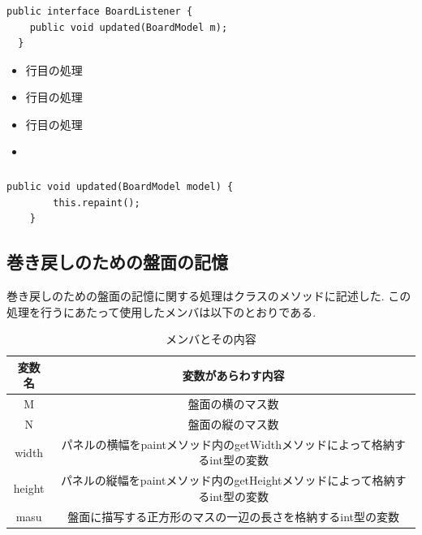 \documentclass[dvipdfmx]{jarticle}
\begin{document}
\subsubsection{}
\begin{lstlisting}[caption=コード,label=fuga]
  public interface BoardListener {
    public void updated(BoardModel m);
  }
\end{lstlisting}
\begin{itemize}
  \item 行目の処理\mbox{}\\
  \item 行目の処理\mbox{}\\
  \item 行目の処理\mbox{}\\
  \item 
\end{itemize}
\subsubsection{}
\begin{lstlisting}[caption=コード,label=fuga]
  public void updated(BoardModel model) {
		this.repaint();
	}
\end{lstlisting}

\subsection{巻き戻しのための盤面の記憶}
巻き戻しのための盤面の記憶に関する処理はクラスのメソッドに記述した.
この処理を行うにあたって使用したメンバは以下のとおりである.
\begin{table}[h]
  \centering
  \begin{tabular}{|c||c|}
    \hline
    変数名 & 変数があらわす内容\\
    \hline\hline
    M & 盤面の横のマス数\\\hline
    N & 盤面の縦のマス数\\\hline
    width & パネルの横幅をpaintメソッド内のgetWidthメソッドによって格納するint型の変数 \\\hline
    height & パネルの縦幅をpaintメソッド内のgetHeightメソッドによって格納するint型の変数\\\hline
    masu & 盤面に描写する正方形のマスの一辺の長さを格納するint型の変数\\\hline

  \end{tabular}
  \caption{メンバとその内容}
\end{table}
\end{document}
